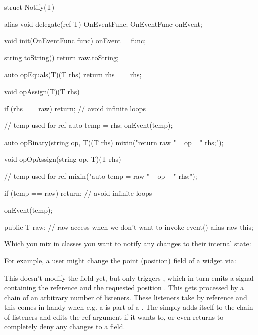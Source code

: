 \begin{dcode}
struct Notify(T)
{
    alias void delegate(ref T) OnEventFunc;
    OnEventFunc onEvent;

    void init(OnEventFunc func) {
        onEvent = func;
    }

    string toString()
    {
        return raw.toString;
    }

    auto opEquals(T)(T rhs)
    {
        return rhs == rhs;
    }

    void opAssign(T)(T rhs)
    {
        if (rhs == raw)
            return;  // avoid infinite loops
        
        // temp used for ref
        auto temp = rhs;  
        onEvent(temp);
    }

    auto opBinary(string op, T)(T rhs)
    {
        mixin("return raw " ~ op ~ " rhs;");
    }

    void opOpAssign(string op, T)(T rhs)
    {
        // temp used for ref
        mixin("auto temp = raw " ~ op ~ " rhs;");  

        if (temp == raw)
            return;  // avoid infinite loops

        onEvent(temp);
    }

    public T raw;  // raw access when we don't want to invoke event()
    alias raw this;
}
\end{dcode}

Which you mix in classes you want to notify any changes to their internal state:


For example, a user might change the point (position) field of a widget via: 

\begin{dcode}
Point moveBy = Point(10, 0); widget.point += moveBy;}. 
\end{dcode}

This doesn't modify the field yet, but only triggers , which in turn emits a signal containing the  reference and the requested position . This gets processed by a chain of an arbitrary number of listeners. These listeners take  by reference and this comes in handy when e.g. a  is part of a . The  simply adds itself to the chain of listeners and edits the ref argument if it wants to, or even returns  to completely deny any changes to a field.

